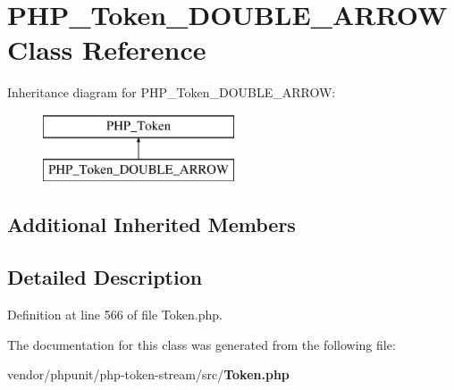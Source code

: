 \section{P\+H\+P\+\_\+\+Token\+\_\+\+D\+O\+U\+B\+L\+E\+\_\+\+A\+R\+R\+O\+W Class Reference}
\label{class_p_h_p___token___d_o_u_b_l_e___a_r_r_o_w}
Inheritance diagram for P\+H\+P\+\_\+\+Token\+\_\+\+D\+O\+U\+B\+L\+E\+\_\+\+A\+R\+R\+O\+W\+:\begin{figure}[H]
\begin{center}
\leavevmode
\includegraphics[height=2.000000cm]{class_p_h_p___token___d_o_u_b_l_e___a_r_r_o_w}
\end{center}
\end{figure}
\subsection*{Additional Inherited Members}


\subsection{Detailed Description}


Definition at line 566 of file Token.\+php.



The documentation for this class was generated from the following file\+:\begin{DoxyCompactItemize}
\item 
vendor/phpunit/php-\/token-\/stream/src/{\bf Token.\+php}\end{DoxyCompactItemize}
